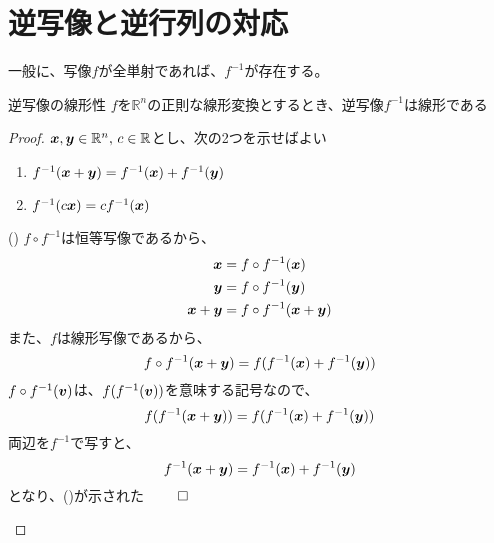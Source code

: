 \documentclass[../../../topic_linear-algebra]{subfiles}
\begin{document}
\sectionline
\section{逆写像と逆行列の対応}

一般に、写像$f$が全単射であれば、$f^{-1}$が存在する。

\begin{theorem}{逆写像の線形性}
  $f$を$\mathbb{R}^n$の正則な線形変換とするとき、逆写像$f^{-1}$は線形である
\end{theorem}

\begin{proof}
  $\vb*{x},\vb*{y} \in \mathbb{R}^n,\, c \in \mathbb{R}$とし、次の2つを示せばよい
  \begin{enumerate}[label=\romanlabel]
    \item $f^{-1}(\vb*{x} + \vb*{y}) = f^{-1}(\vb*{x}) + f^{-1}(\vb*{y})$
    \item $f^{-1}(c\vb*{x}) = c f^{-1}(\vb*{x})$
  \end{enumerate}

  \begin{subpattern}{()}
    $f \circ f^{-1}$は恒等写像であるから、
    \begin{align*}
      \vb*{x}           & = f \circ f^{-1}(\vb*{x})           \\
      \vb*{y}           & = f \circ f^{-1}(\vb*{y})           \\
      \vb*{x} + \vb*{y} & = f \circ f^{-1}(\vb*{x} + \vb*{y})
    \end{align*}
    また、$f$は線形写像であるから、
    \begin{equation*}
      f \circ f^{-1}(\vb*{x} + \vb*{y}) = f(f^{-1}(\vb*{x}) + f^{-1}(\vb*{y}))
    \end{equation*}
    $f \circ f^{-1}(\vb*{v})$は、$f (f^{-1}(\vb*{v}))$を意味する記号なので、
    \begin{equation*}
      f(f^{-1}(\vb*{x}+\vb*{y})) = f(f^{-1}(\vb*{x}) + f^{-1}(\vb*{y}))
    \end{equation*}
    両辺を$f^{-1}$で写すと、
    \begin{equation*}
      f^{-1}(\vb*{x} + \vb*{y}) = f^{-1}(\vb*{x}) + f^{-1}(\vb*{y})
    \end{equation*}
    となり、()が示された $\qed$
  \end{subpattern}


\end{proof}
\end{document}
